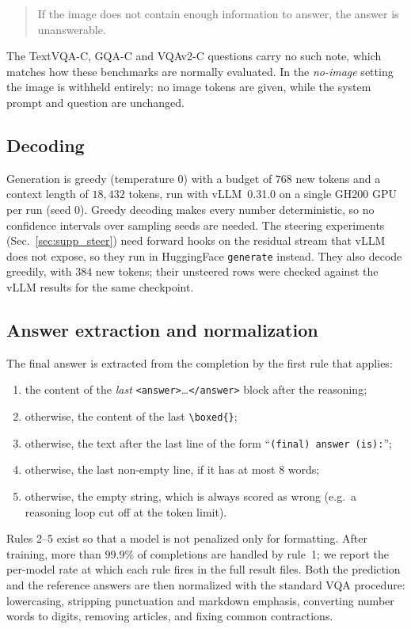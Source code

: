 \begin{quote}\small\ttfamily
If the image does not contain enough information to answer, the answer is unanswerable.
\end{quote}

The TextVQA-C, GQA-C and VQAv2-C questions carry no such note, which matches how these
benchmarks are normally evaluated. In the \emph{no-image} setting the image is withheld
entirely: no image tokens are given, while the system prompt and question are unchanged.

\subsection{Decoding}
\label{sec:supp_eval_decoding}

Generation is greedy (temperature $0$) with a budget of $768$ new tokens and a context
length of $18{,}432$ tokens, run with vLLM~0.31.0 on a single GH200 GPU per run (seed $0$).
Greedy decoding makes every number deterministic, so no confidence intervals over
sampling seeds are needed. The steering experiments (Sec.~\ref{sec:supp_steer}) need
forward hooks on the residual stream that vLLM does not expose, so they run in
HuggingFace \texttt{generate} instead. They also decode greedily, with $384$ new tokens;
their unsteered rows were checked against the vLLM results for the same checkpoint.

\subsection{Answer extraction and normalization}
\label{sec:supp_eval_extract}

The final answer is extracted from the completion by the first rule that applies:
\begin{enumerate}\itemsep0pt
  \item the content of the \emph{last} \texttt{<answer>}\dots\texttt{</answer>} block
        after the reasoning;
  \item otherwise, the content of the last \texttt{\textbackslash boxed\{\}};
  \item otherwise, the text after the last line of the form
        ``\texttt{(final) answer (is):}'';
  \item otherwise, the last non-empty line, if it has at most $8$ words;
  \item otherwise, the empty string, which is always scored as wrong (e.g.\ a reasoning
        loop cut off at the token limit).
\end{enumerate}
Rules 2--5 exist so that a model is not penalized only for formatting. After training,
more than $99.9\%$ of completions are handled by rule~1; we report the per-model rate at
which each rule fires in the full result files. Both the prediction and the reference
answers are then normalized with the standard VQA procedure: lowercasing, stripping
punctuation and markdown emphasis, converting number words to digits, removing articles,
and fixing common contractions.

